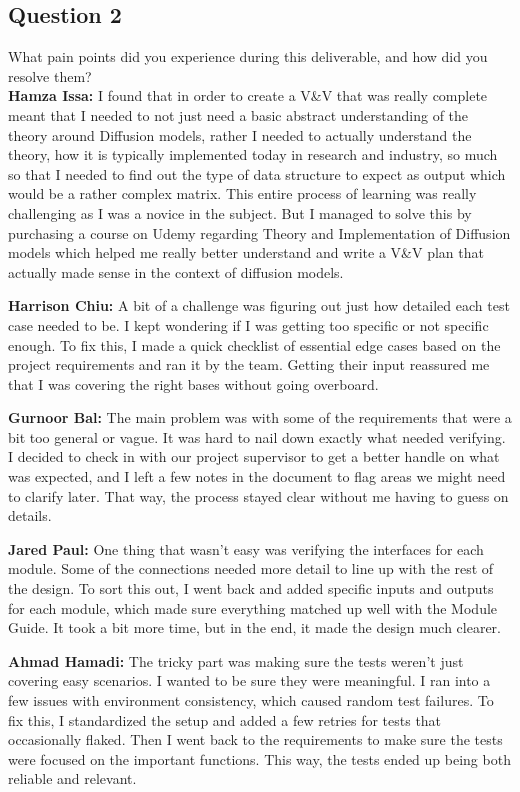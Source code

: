 \documentclass[12pt, titlepage]{article}
\begin{document}
\subsection{Question 2}
What pain points did you experience during this deliverable, and how did you resolve them? \\

\textbf{Hamza Issa:} I found that in order to create a V\&V that was really complete meant that I needed to not just need a basic abstract understanding of the theory around Diffusion models, rather I needed to actually understand the theory, how it is typically implemented today in research and industry, so much so that I needed to find out the type of data structure to expect as output which would be a rather complex matrix. This entire process of learning was really challenging as I was a novice in the subject. But I managed to solve this by purchasing a course on Udemy regarding Theory and Implementation of Diffusion models which helped me really better understand and write a V\&V plan that actually made sense in the context of diffusion models.

\textbf{Harrison Chiu:} A bit of a challenge was figuring out just how detailed each test case needed to be. I kept wondering if I was getting too specific or not specific enough. To fix this, I made a quick checklist of essential edge cases based on the project requirements and ran it by the team. Getting their input reassured me that I was covering the right bases without going overboard.

\textbf{Gurnoor Bal:} The main problem was with some of the requirements that were a bit too general or vague. It was hard to nail down exactly what needed verifying. I decided to check in with our project supervisor to get a better handle on what was expected, and I left a few notes in the document to flag areas we might need to clarify later. That way, the process stayed clear without me having to guess on details.

\textbf{Jared Paul:} One thing that wasn't easy was verifying the interfaces for each module. Some of the connections needed more detail to line up with the rest of the design. To sort this out, I went back and added specific inputs and outputs for each module, which made sure everything matched up well with the Module Guide. It took a bit more time, but in the end, it made the design much clearer.

\textbf{Ahmad Hamadi:} The tricky part was making sure the tests weren't just covering easy scenarios. I wanted to be sure they were meaningful. I ran into a few issues with environment consistency, which caused random test failures. To fix this, I standardized the setup and added a few retries for tests that occasionally flaked. Then I went back to the requirements to make sure the tests were focused on the important functions. This way, the tests ended up being both reliable and relevant.
\end{document}
